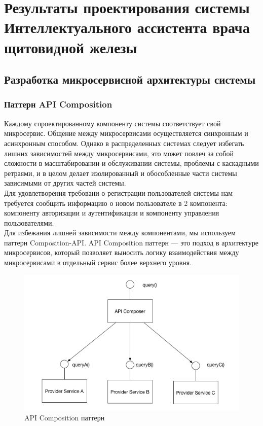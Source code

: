 \chapter{Результаты проектирования системы Интеллектуального ассистента врача щитовидной железы}

\section{Разработка микросервисной архитектуры системы}

\subsection{Паттерн API Composition}
Каждому спроектированному компоненту системы соответствует свой микросервис. Общение между микросервисами осуществляется 
синхронным и асинхронным способом. Однако в распределенных системах следует избегать лишних зависимостей между микросервисами, это
может повлеч за собой сложности в масштабировании и обслуживании системы, проблемы с каскадными ретраями, и в целом делает изолированный и
обособленные части системы зависимыми от других частей системы.\\
Для удовлетворения требовани о регистрации пользователей системы нам требуется сообщить информацию о новом пользователе в 2 компонента:
компоненту авторизации и аутентификации и компоненту управления пользователями.\\
Для избежания лишней зависимости между компонентами, мы используем паттерн Composition-API. API Composition паттерн 
— это подход в архитектуре микросервисов, который позволяет выносить логику взаимодействия между микросервисами в отдельный сервис более верхнего уровня.

\begin{figure}[H]%
	\begin{center}
		\includegraphics[width=.6\columnwidth]{./img/new/api_composition_pattern.png}%
	\end{center}
	\caption{API Composition паттерн}%
	\label{pic:api_composition_pattern}%
\end{figure}

